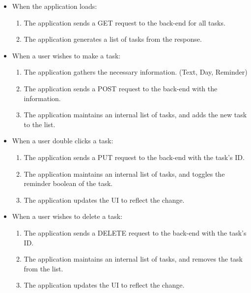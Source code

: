 \documentclass{article}
\begin{document}
\begin{itemize}
    \item When the application loads:
          \begin{enumerate}
              \item The application sends a GET request to the back-end for all tasks.
              \item The application generates a list of tasks from the response.
          \end{enumerate}
    \item When a user wishes to make a task:
          \begin{enumerate}
              \item The application gathers the necessary information. (Text, Day, Reminder)
              \item The application sends a POST request to the back-end with the information.
              \item The application maintains an internal list of tasks, and adds the new task to the list.
          \end{enumerate}
    \item When a user double clicks a task:
          \begin{enumerate}
              \item The application sends a PUT request to the back-end with the task's ID.
              \item The application maintains an internal list of tasks, and toggles the reminder boolean of the task.
              \item The application updates the UI to reflect the change.
          \end{enumerate}
    \item When a user wishes to delete a task:
          \begin{enumerate}
              \item The application sends a DELETE request to the back-end with the task's ID.
              \item The application maintains an internal list of tasks, and removes the task from the list.
              \item The application updates the UI to reflect the change.
          \end{enumerate}
\end{itemize}
\end{document}
